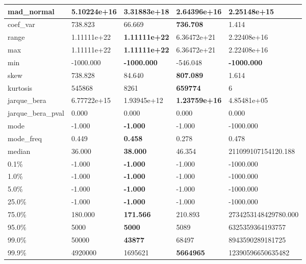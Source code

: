 \begin{table}[H]
\begin{tabular}{|l|m{10em}|m{10em}|m{10em}|m{10em}|}
\hline mad\_normal & 5.10224e+16 & \cellcolor[rgb]{0.9, 0.54, 0.52} 3.31883e+18 & \bfseries 2.64396e+16 & 2.25148e+15 \\
\hline coef\_var & 738.823 & 66.669 & \bfseries 736.708 & \cellcolor[rgb]{0.9, 0.54, 0.52} 1.414 \\
\hline range & 1.11111e+22 & \bfseries 1.11111e+22 & 6.36472e+21 & \cellcolor[rgb]{0.9, 0.54, 0.52} 2.22408e+16 \\
\hline max & 1.11111e+22 & \bfseries 1.11111e+22 & 6.36472e+21 & \cellcolor[rgb]{0.9, 0.54, 0.52} 2.22408e+16 \\
\hline min & -1000.000 & \bfseries -1000.000 & \cellcolor[rgb]{0.9, 0.54, 0.52} -546.048 & \bfseries -1000.000 \\
\hline skew & 738.828 & 84.640 & \bfseries 807.089 & \cellcolor[rgb]{0.9, 0.54, 0.52} 1.614 \\
\hline kurtosis & 545868 & 8261 & \bfseries 659774 & \cellcolor[rgb]{0.9, 0.54, 0.52} 6 \\
\hline jarque\_bera & 6.77722e+15 & 1.93945e+12 & \bfseries 1.23759e+16 & \cellcolor[rgb]{0.9, 0.54, 0.52} 4.85481e+05 \\
\hline jarque\_bera\_pval & 0.000 & 0.000 & 0.000 & 0.000 \\
\hline mode & -1.000 & \bfseries -1.000 & -1.000 & \cellcolor[rgb]{0.9, 0.54, 0.52} -1000.000 \\
\hline mode\_freq & 0.449 & \bfseries 0.458 & \cellcolor[rgb]{0.9, 0.54, 0.52} 0.278 & 0.478 \\
\hline median & 36.000 & \bfseries 38.000 & 46.354 & \cellcolor[rgb]{0.9, 0.54, 0.52} 211099107154120.188 \\
\hline 0.1\% & -1.000 & \bfseries -1.000 & -1.000 & \cellcolor[rgb]{0.9, 0.54, 0.52} -1000.000 \\
\hline 1.0\% & -1.000 & \bfseries -1.000 & -1.000 & \cellcolor[rgb]{0.9, 0.54, 0.52} -1000.000 \\
\hline 5.0\% & -1.000 & \bfseries -1.000 & -1.000 & \cellcolor[rgb]{0.9, 0.54, 0.52} -1000.000 \\
\hline 25.0\% & -1.000 & \bfseries -1.000 & -1.000 & \cellcolor[rgb]{0.9, 0.54, 0.52} -1000.000 \\
\hline 75.0\% & 180.000 & \bfseries 171.566 & 210.893 & \cellcolor[rgb]{0.9, 0.54, 0.52} 2734253148429780.000 \\
\hline 95.0\% & 5000 & \bfseries 5000 & 5089 & \cellcolor[rgb]{0.9, 0.54, 0.52} 6325359364193757 \\
\hline 99.0\% & 50000 & \bfseries 43877 & 68497 & \cellcolor[rgb]{0.9, 0.54, 0.52} 8943590289181725 \\
\hline 99.9\% & 4920000 & 1695621 & \bfseries 5664965 & \cellcolor[rgb]{0.9, 0.54, 0.52} 12390596650635482 \\
\hline
\end{tabular}
\end{table}
